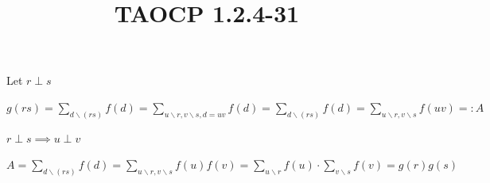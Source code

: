 \documentclass{article}
\title{TAOCP 1.2.4\mbox{-}31}
\begin{document}
\maketitle

Let \( r \perp s \)

\( g(rs) = \sum_{d \backslash (rs)} f(d) = \sum_{u\backslash r, v \backslash s, d = uv} f(d) = \sum_{d \backslash (rs)} f(d) = \sum_{u\backslash r, v \backslash s} f(uv) =: A \)

\( r \perp s \implies u \perp v \)

\( A = \sum_{d \backslash (rs)} f(d) = \sum_{u\backslash r, v \backslash s} f(u)f(v) = \sum_{u\backslash r} f(u) \cdot \sum_{v\backslash s} f(v) = g(r)g(s) \)
\end{document}
